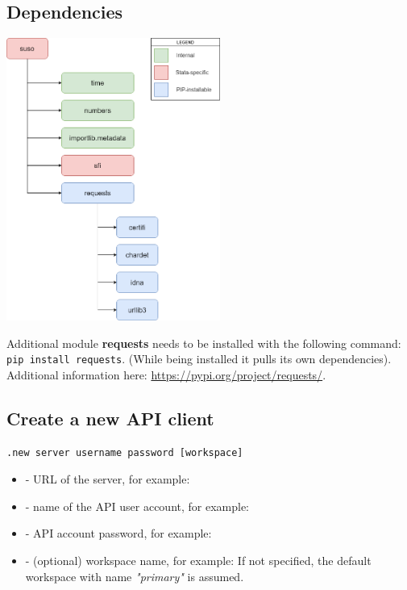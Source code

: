 \subsection{Dependencies}
\begin{center}
    \includegraphics[width=70mm]{images/generated/susoapi-dependencies.png}
\end{center}

Additional module \textbf{requests} needs to be installed with the following
command: \texttt{pip install requests}. (While being installed it pulls its
own dependencies). Additional information here:\newline
\href{https://pypi.org/project/requests/}{https://pypi.org/project/requests/}.

\vskip16pt
\subsection{Create a new API client}
\begin{lstlisting}[style=CommandLineStyle, showlines=true]
.new server username password [workspace]
\end{lstlisting}

\paramsheader
\begin{itemize}

\item {} - URL of the server, for example:

\item {} - name of the API user account, for example:

\item {} - API account password, for example:

\item {} - (optional) workspace name, for example:
 \newline
If not specified, the default workspace with name \textit{"primary"} is assumed.

\end{itemize}

